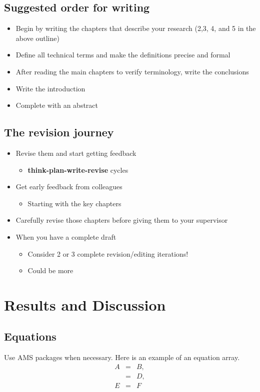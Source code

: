 \documentclass{utmthesis}
\begin{document}
\section{Suggested order for writing}
\begin{itemize}
\item Begin by writing the chapters that describe your research (2,3, 4,
and 5 in the above outline)
\item Define all technical terms and make the definitions precise and formal
\item After reading the main chapters to verify terminology, write the conclusions
\item Write the introduction
\item Complete with an abstract
\end{itemize}

\section{The revision journey }
\begin{itemize}
\item Revise them and start getting feedback 
\begin{itemize}
\item \textbf{think-plan-write-revise} cycles
\end{itemize}
\item Get early feedback from colleagues
\begin{itemize}
\item Starting with the key chapters
\end{itemize}
\item Carefully revise those chapters before giving them to your supervisor
\item When you have a complete draft 
\begin{itemize}
\item Consider 2 or 3 complete revision/editing iterations!
\item Could be more
\end{itemize}
\end{itemize}

\chapter{Results and Discussion}

\section{Equations}
Use AMS packages when necessary. Here is an example of an equation array.
\begin{eqnarray}
A&=&B,\nonumber\\
 &=&D,\\
E&=&F
\end{eqnarray}
\end{document}
